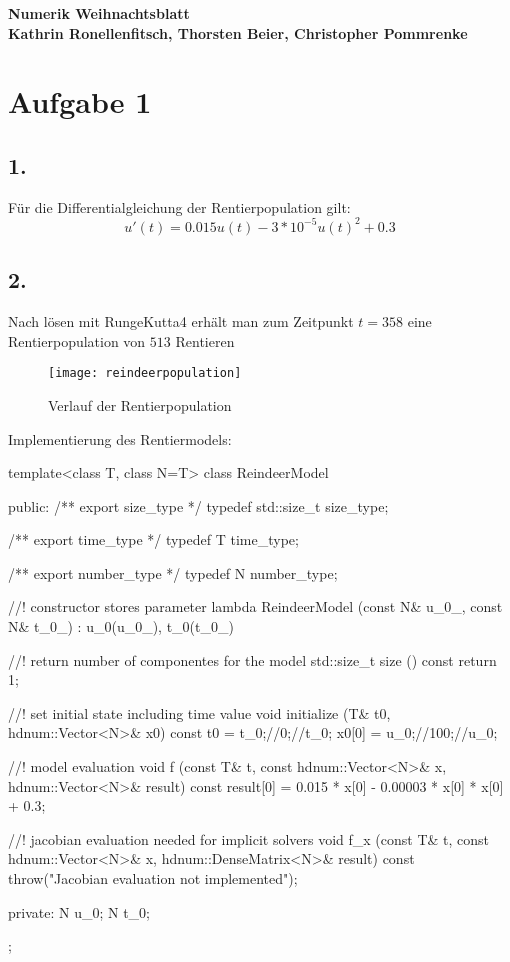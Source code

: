 \documentclass[10pt,oneside,a4paper]{scrartcl}
\begin{document}
    \begin{center}
        \huge %
        \bfseries %
        \sffamily %
        Numerik Weihnachtsblatt\\[1em]
        \normalsize
        Kathrin Ronellenfitsch, Thorsten Beier, Christopher Pommrenke
    \end{center}

    \section*{Aufgabe 1}
    \subsection*{1.}
        Für die Differentialgleichung der Rentierpopulation gilt:
        \begin{equation*}
            u'(t) = 0.015u(t) - 3 * 10^{-5}u(t)^2 + 0.3
        \end{equation*}
    \subsection*{2.}
        Nach lösen mit RungeKutta4 erhält man zum Zeitpunkt $t = 358$ eine
        Rentierpopulation von $513$ Rentieren
        \begin{figure}[htbp]
            \centering
            \texttt{[image: reindeerpopulation]}%
            \caption{Verlauf der Rentierpopulation}%
        \end{figure}
        
        \newpage
        Implementierung des Rentiermodels:\\
        \begin{cppcode}
template<class T, class N=T>
class ReindeerModel
{
public:
  /** \brief export size_type */
  typedef std::size_t size_type;

  /** \brief export time_type */
  typedef T time_type;

  /** \brief export number_type */
  typedef N number_type;

  //! constructor stores parameter lambda
  ReindeerModel (const N& u_0_, const N& t_0_)
    : u_0(u_0_), t_0(t_0_)
  {}

  //! return number of componentes for the model
  std::size_t size () const
  {
    return 1;
  }

  //! set initial state including time value
  void initialize (T& t0, hdnum::Vector<N>& x0) const
  {
    t0 = t_0;//0;//t_0;
    x0[0] = u_0;//100;//u_0;
  }

  //! model evaluation
  void f (const T& t, const hdnum::Vector<N>& x, hdnum::Vector<N>& result) const
  {
    result[0] = 0.015 * x[0] - 0.00003 * x[0] * x[0] + 0.3;
  }

  //! jacobian evaluation needed for implicit solvers
  void f_x (const T& t, const hdnum::Vector<N>& x, hdnum::DenseMatrix<N>& result) const
  {
    throw("Jacobian evaluation not implemented");
  }

private:
  N u_0;
  N t_0;
};        
        \end{cppcode}
        
\end{document}
